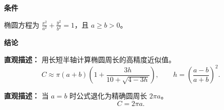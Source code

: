 \begin{statementbox}
	\textbf{\textcolor{CStatement}{条件}}

	\begin{description}[style=nextline, leftmargin=2.8em, labelsep=0.5em, itemsep=0.35em]
		\item[\textbf{\textcolor{CStatement}{条件1（椭圆标准型）：}}]
		      椭圆方程为 $\frac{x^2}{a^2}+\frac{y^2}{b^2}=1$，且 $a\ge b>0$。
	\end{description}

	\textbf{\textcolor{CStatement}{结论}}

	\begin{description}[style=nextline, leftmargin=2.8em, labelsep=0.5em, itemsep=0.45em]
		\item[\textbf{\textcolor{CStatement}{结论一（Ramanujan近似）：}}]
		      \textbf{\textcolor{CStatement}{直观描述：}} 用长短半轴计算椭圆周长的高精度近似值。
		      \[
			      C\approx \pi(a+b)\left(1+\frac{3h}{10+\sqrt{4-3h}}\right),
			      \qquad
			      h=\left(\frac{a-b}{a+b}\right)^2.
		      \]

		\item[\textbf{\textcolor{CStatement}{推广结论（圆特例）：}}]
		      \textbf{\textcolor{CStatement}{直观描述：}} 当 $a=b$ 时公式退化为精确圆周长 $2\pi a$。
		      \[
			      C=2\pi a.
		      \]
	\end{description}
\end{statementbox}
